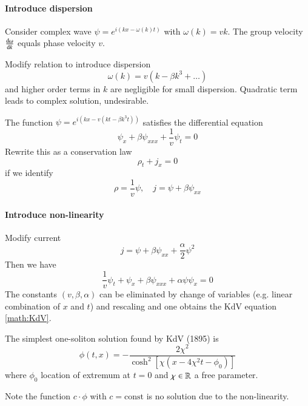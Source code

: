 \paragraph{Introduce dispersion} Consider complex wave $\psi = e^{i(kx - \omega(k)t)}$ with $\omega(k) = vk$. The group velocity $\dv{\omega}{k} $ equals phase velocity $v$.

Modify relation to introduce dispersion
\begin{equation*}
	\omega(k) = v(k - \beta k^3 + \dots)
\end{equation*}
and higher order terms in $k$ are negligible for small dispersion. Quadratic term leads to complex solution, undesirable.

The function $\psi = e^{i(kx - v(kt - \beta k^3 t))}$ satisfies the differential equation
\begin{equation*}
	\psi_{x} + \beta \psi_{x x x} + \frac{1}{v} \psi_t = 0
\end{equation*}
Rewrite this as a conservation law
\begin{equation*}
	\rho_t + j_{x} = 0
\end{equation*}
if we identify
\begin{equation*}
	\rho = \frac{1}{v} \psi, \quad j = \psi + \beta \psi_{x x}
\end{equation*}

\paragraph{Introduce non-linearity} Modify current
\begin{equation*}
	j = \psi + \beta \psi_{x x} + \frac{\alpha}{2} \psi^2 
\end{equation*}
Then we have 
\begin{equation*}
	\frac{1}{v} \psi_t + \psi_x + \beta \psi_{ x x x} + \alpha \psi \psi_x = 0
\end{equation*}
The constants $(v, \beta, \alpha)$ can be eliminated by change of variables (e.g. linear combination of $x$ and $t$) and rescaling and one obtains the KdV equation \eqref{math:KdV}.

The simplest one-soliton solution found by KdV (1895) is 
\begin{equation}
	\phi (t, x) = - \frac{2\chi^2}{\cosh^2[\chi(x-4\chi^2t - \phi_0)]}
\end{equation}
where $\phi_0$ location of extremum at $t=0$ and $\chi\in\mathbb{R}$ a free parameter.

Note the function $c \cdot \phi$ with $c=\text{const}$ is no solution due to the non-linearity.

